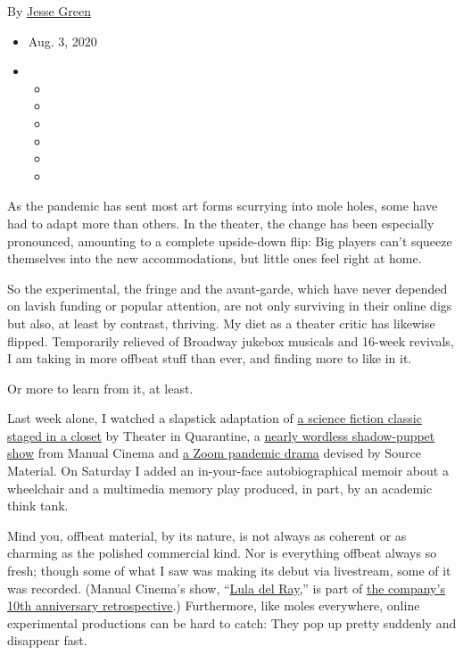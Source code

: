 By \href{https://www.nytimes.com/by/jesse-green}{Jesse Green}

\begin{itemize}
\item
  Aug. 3, 2020
\item
  \begin{itemize}
  \item
  \item
  \item
  \item
  \item
  \item
  \end{itemize}
\end{itemize}

As the pandemic has sent most art forms scurrying into mole holes, some
have had to adapt more than others. In the theater, the change has been
especially pronounced, amounting to a complete upside-down flip: Big
players can't squeeze themselves into the new accommodations, but little
ones feel right at home.

So the experimental, the fringe and the avant-garde, which have never
depended on lavish funding or popular attention, are not only surviving
in their online digs but also, at least by contrast, thriving. My diet
as a theater critic has likewise flipped. Temporarily relieved of
Broadway jukebox musicals and 16-week revivals, I am taking in more
offbeat stuff than ever, and finding more to like in it.

Or more to learn from it, at least.

Last week alone, I watched a slapstick adaptation of
\href{https://www.nytimes.com/2020/07/31/theater/the-7th-voyage-of-egon-tichy-review.html}{a
science fiction classic staged in a closet} by Theater in Quarantine, a
\href{http://manualcinema.com/watch/}{nearly wordless shadow-puppet
show} from Manual Cinema and
\href{https://www.nytimes.com/2020/07/26/theater/in-these-uncertain-times-review.html}{a
Zoom pandemic drama} devised by Source Material. On Saturday I added an
in-your-face autobiographical memoir about a wheelchair and a multimedia
memory play produced, in part, by an academic think tank.

Mind you, offbeat material, by its nature, is not always as coherent or
as charming as the polished commercial kind. Nor is everything offbeat
always so fresh; though some of what I saw was making its debut via
livestream, some of it was recorded. (Manual Cinema's show,
``\href{https://www.nytimes.com/2017/01/06/theater/lula-del-ray-a-spectral-parade-of-fantastical-images.html}{Lula
del Ray},'' is part of
\href{https://www.nytimes.com/2020/07/23/theater/manual-cinema-puppets-retrospective.html}{the
company's 10th anniversary retrospective}.) Furthermore, like moles
everywhere, online experimental productions can be hard to catch: They
pop up pretty suddenly and disappear fast.

